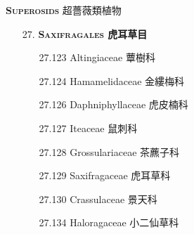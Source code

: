 \vspace{2ex} 
\noindent \normalsize\textsc{\textbf{Superosids} 超薔薇類植物}\selectfont \\
\footnotesize\selectfont
\begin{enumerate}
  \item[27. ] \textbf{\textsc{Saxifragales} 虎耳草目}   
    \begin{enumerate}
      \item[27.123] Altingiaceae 蕈樹科     
        
      \item[27.124] Hamamelidaceae 金縷梅科     
        
      \item[27.126] Daphniphyllaceae 虎皮楠科     
        
      \item[27.127] Iteaceae 鼠刺科     
        
      \item[27.128] Grossulariaceae 茶藨子科     
        
      \item[27.129] Saxifragaceae 虎耳草科     
        
      \item[27.130] Crassulaceae 景天科     
        
      \item[27.134] Haloragaceae 小二仙草科     
        
    \end{enumerate}
\end{enumerate}
\vspace{2ex} 
